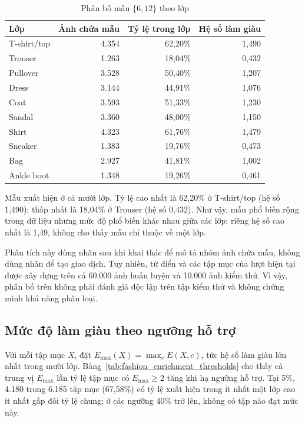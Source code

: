 \begin{table}[!t]
    \centering
    \caption{Phân bố mẫu $\{6,12\}$ theo lớp}
    \label{tab:pattern_class_distribution}
    \scriptsize
    \setlength{\tabcolsep}{2pt}
    \begin{tabular}{@{}l r r r@{}}
        \toprule
        \textbf{Lớp} & \textbf{Ảnh chứa mẫu} & \textbf{Tỷ lệ trong lớp} & \textbf{Hệ số làm giàu} \\
        \midrule
        T-shirt/top & 4.354 & 62,20\% & 1,490 \\
        Trouser & 1.263 & 18,04\% & 0,432 \\
        Pullover & 3.528 & 50,40\% & 1,207 \\
        Dress & 3.144 & 44,91\% & 1,076 \\
        Coat & 3.593 & 51,33\% & 1,230 \\
        Sandal & 3.360 & 48,00\% & 1,150 \\
        Shirt & 4.323 & 61,76\% & 1,479 \\
        Sneaker & 1.383 & 19,76\% & 0,473 \\
        Bag & 2.927 & 41,81\% & 1,002 \\
        Ankle boot & 1.348 & 19,26\% & 0,461 \\
        \bottomrule
    \end{tabular}
\end{table}

Mẫu xuất hiện ở cả mười lớp. Tỷ lệ cao nhất là 62,20\% ở T-shirt/top (hệ số 1,490); thấp nhất là 18,04\% ở Trouser (hệ số 0,432). Như vậy, mẫu phổ biến rộng trong dữ liệu nhưng mức độ phổ biến khác nhau giữa các lớp; riêng hệ số cao nhất là 1,49, không cho thấy mẫu chỉ thuộc về một lớp.

Phân tích này dùng nhãn sau khi khai thác để mô tả nhóm ảnh chứa mẫu, không dùng nhãn để tạo giao dịch. Tuy nhiên, từ điển và các tập mục của lượt hiện tại được xây dựng trên cả 60.000 ảnh huấn luyện và 10.000 ảnh kiểm thử. Vì vậy, phân bố trên không phải đánh giá độc lập trên tập kiểm thử và không chứng minh khả năng phân loại.

\subsection{Mức độ làm giàu theo ngưỡng hỗ trợ}

Với mỗi tập mục $X$, đặt $E_{\max}(X)=\max_c E(X,c)$, tức hệ số làm giàu lớn nhất trong mười lớp. Bảng~\ref{tab:fashion_enrichment_thresholds} cho thấy cả trung vị $E_{\max}$ lẫn tỷ lệ tập mục có $E_{\max}\geq2$ tăng khi hạ ngưỡng hỗ trợ. Tại 5\%, 4.180 trong 6.185 tập mục (67,58\%) có tỷ lệ xuất hiện trong ít nhất một lớp cao ít nhất gấp đôi tỷ lệ chung; ở các ngưỡng 40\% trở lên, không có tập nào đạt mức này.

